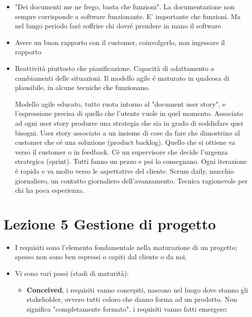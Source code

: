 \documentclass[a4paper,10pt] {article}
\begin{document}
\begin{itemize}
\begin{itemize}
\begin{itemize}
\begin{itemize}
	\item "Dei documenti me ne frego, basta che funzioni". La documentazione 
	non sempre corrisponde a software funzionante. E' importante che funzioni. 
	Ma nel lungo periodo faré soffrire chi dovré prendere in mano il 
	software
	
	\item Avere un buon rapporto con il customer, coinvolgerlo, non ingessare 
	il rapporto
	
	\item Reattività piuttosto che pianificazione. Capacità di adattamento 
	a cambiamenti delle situazioni.
	Il modello agile é maturato in qualcosa di plausibile, in alcune tecniche 
	che funzionano.
	
	
	Modello agile educato, tutto ruota intorno al "document user story", e 
	l'espressione precisa di quello
	che l'utente vuole in quel momento. Associato ad ogni user story produrre 
	una strategia che sia in grado di soddisfare quei bisogni. User story 
	associato a un insieme di cose da fare che dimostrino al customer
	che cé una soluzione (product backlog). Quello che si ottiene va verso il 
	customer o in feedback. Cé un supervisore che decide l'urgenza strategica 
	(sprint). Tutti fanno un pezzo e poi lo consegnano. Ogni iterazione é 
	rapida e va molto verso le aspettative del cliente.
	Scrum daily, mucchio giornaliero, un contatto giornaliero dell'avanzamento. 
	Tecnica ragionevole per chi ha poca esperienza.
	\end{itemize}
\end{itemize}	

\end{itemize}
\section{Lezione 5 Gestione di progetto}
\begin{itemize}
	\item I requisiti sono l'elemento fondamentale nella maturazione di un 
	progetto; spesso non sono ben espressi o capiti dal cliente o da noi. 
	
	\item Vi sono vari passi (stadi di maturità):
	\begin{itemize}
		
	\item \textbf{Conceived}, i requisiti vanno concepiti, nascono nel luogo 
	dove stanno gli stakeholder, ovvero tutti coloro che danno forma ad un 
	prodotto. Non significa "completamente formato", i requisiti vanno fatti
	emergere;
	

\end{itemize}
\end{itemize}
\end{itemize}
\end{document}

